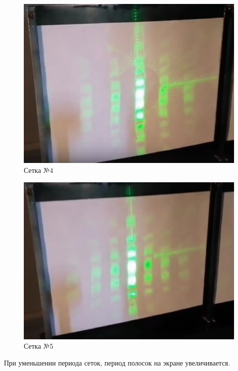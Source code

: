 \documentclass[a4paper, 12pt]{article}
\begin{document}
\begin{figure}[h!]
\begin{center}
\includegraphics[width=1\textwidth]{Сетка4.png}
\end{center}
\caption{Сетка №4} \label{Сетка-4}
\end{figure}

\begin{figure}[h!]
\begin{center}
\includegraphics[width=1\textwidth]{Сетка5.png}
\end{center}
\caption{Сетка №5} \label{Сетка-5}
\end{figure}

\clearpage
При уменьшении периода сеток, период полосок на экране увеличивается.
\end{document}
